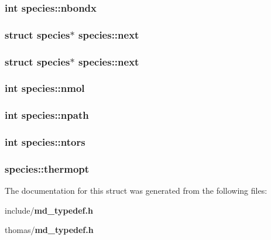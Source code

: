 \subsubsection{\setlength{\rightskip}{0pt plus 5cm}int {\bf species::nbondx}}\label{structspecies_9d99eddcb43daa1713b617de6f6356b7}


\subsubsection{\setlength{\rightskip}{0pt plus 5cm}struct {\bf species}$\ast$ {\bf species::next}}\label{structspecies_afa47d89050ada98787b482e59a3c01a}


\subsubsection{\setlength{\rightskip}{0pt plus 5cm}struct {\bf species}$\ast$ {\bf species::next}}\label{structspecies_afa47d89050ada98787b482e59a3c01a}


\subsubsection{\setlength{\rightskip}{0pt plus 5cm}int {\bf species::nmol}}\label{structspecies_aaece5bb8c4b0467d25aae00c5af3750}


\subsubsection{\setlength{\rightskip}{0pt plus 5cm}int {\bf species::npath}}\label{structspecies_fcf8ebb0d21abf4ecc4c1cf18ff42236}


\subsubsection{\setlength{\rightskip}{0pt plus 5cm}int {\bf species::ntors}}\label{structspecies_e43ee2b18a4ba3923bf07165be02b152}


\subsubsection{ {\bf species::thermopt}}\label{structspecies_cdc36cad137ceff05f9c1ae96884ef17}




The documentation for this struct was generated from the following files:\begin{CompactItemize}
\item 
include/{\bf md\_\-typedef.h}\item 
thomas/{\bf md\_\-typedef.h}\end{CompactItemize}
